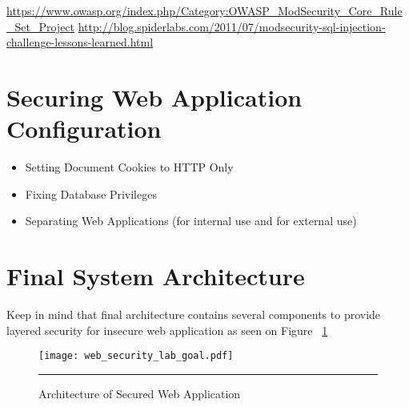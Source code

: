 \url{https://www.owasp.org/index.php/Category:OWASP_ModSecurity_Core_Rule_Set_Project}
\url{http://blog.spiderlabs.com/2011/07/modsecurity-sql-injection-challenge-lessons-learned.html}




\section{Securing Web Application Configuration}
\begin{itemize}
\item Setting Document Cookies to HTTP Only
\item Fixing Database Privileges
\item Separating Web Applications (for internal use and for external use)
\end{itemize}

\section{Final System Architecture} 
Keep in mind that final architecture contains several components to provide layered security for insecure web application as seen on Figure ~\ref{Architecture of Secured Web Application}

\begin{figure}[H] 
 \centering 
 \texttt{[image: web\_security\_lab\_goal.pdf]}
 \rule{35em}{0.5pt} 
 \caption{Architecture of Secured Web Application} 
 \label{Architecture of Secured Web Application} 
\end{figure}


